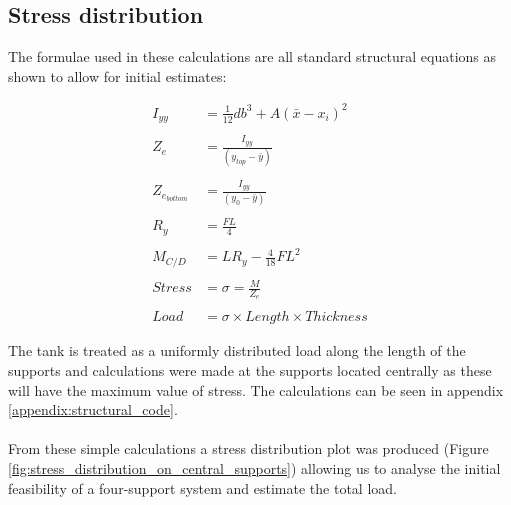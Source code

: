 \subsection{Stress distribution}
The formulae used in these calculations are all standard structural equations as shown to allow for initial estimates: 

\begin{equation}
\begin{split}
  I_{yy} & = \frac{1}{12} d b^{3} + A(\bar{x} - x_{i})^{2} \\ \\
  Z_{e} & = \frac{I_{yy}}{(y_{top} - \bar{y})} \\ \\
  Z_{e_{bottom}} & = \frac{I_{yy}}{(y_{0} - \bar{y})} \\ \\
  R_{y} & = \frac{FL}{4} \\ \\ 
  M_{C/D} & = L R_{y} - \frac{4}{18} FL^{2} \\ \\
  Stress & = \sigma = \frac{M}{Z_{e}} \\ \\
  Load & = \sigma \times Length \times Thickness
\end{split}
  \label{eqn:structures_equations}
\end{equation}

The tank is treated as a uniformly distributed load along the length of the supports and calculations were made at the supports located centrally as these will have the maximum value of stress. The calculations can be seen in appendix \ref{appendix:structural_code}.
\\ \\ 

From these simple calculations a stress distribution plot was produced (Figure \ref{fig:stress_distribution_on_central_supports}) allowing us to analyse the initial feasibility of a four-support system and estimate the total load. 

